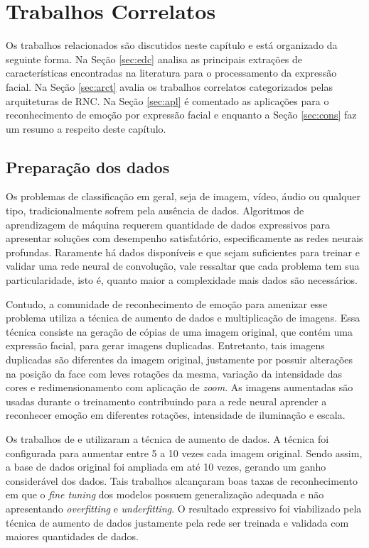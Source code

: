 \chapter{Trabalhos Correlatos}\label{sec:relacionados}
Os trabalhos relacionados são discutidos neste capítulo e está organizado da seguinte forma.  Na Seção \ref{sec:edc} analisa as principais extrações de características encontradas na literatura para o processamento da expressão facial. Na Seção \ref{sec:arct} avalia os trabalhos correlatos categorizados pelas arquiteturas de RNC. Na Seção \ref{sec:apl} é comentado as aplicações para o reconhecimento de emoção por expressão facial e enquanto a Seção \ref{sec:cons} faz um resumo a respeito deste capítulo.


\section{Preparação dos dados}\label{sec:dataprepared}
Os problemas de classificação em geral, seja de imagem, vídeo, áudio ou qualquer tipo, tradicionalmente sofrem pela ausência de dados. Algoritmos de aprendizagem de máquina requerem quantidade de dados expressivos para apresentar soluções com desempenho satisfatório, especificamente as redes neurais profundas. Raramente há dados disponíveis e que sejam suficientes para treinar e validar uma rede neural de convolução, vale ressaltar que cada problema tem sua particularidade, isto é, quanto maior a complexidade mais dados são necessários. 

Contudo, a comunidade de reconhecimento de emoção para amenizar esse problema utiliza a técnica de aumento de dados e multiplicação de imagens. Essa técnica consiste na geração de cópias de uma imagem original, que contém uma expressão facial, para gerar imagens duplicadas. Entretanto, tais imagens duplicadas são diferentes da imagem original, justamente por possuir alterações na posição da face com leves rotações da mesma, variação da intensidade das cores e redimensionamento com aplicação de \textit{zoom}. As imagens aumentadas são usadas durante o treinamento contribuindo para a rede neural aprender a reconhecer emoção em diferentes rotações, intensidade de iluminação e escala. 

Os trabalhos de \cite{art4, art6, art7, art8, art11} e \cite{art15} utilizaram a técnica de aumento de dados. A técnica foi configurada para aumentar entre 5 a 10 vezes cada imagem original. Sendo assim, a base de dados original foi ampliada em até 10 vezes, gerando um ganho considerável dos dados. Tais trabalhos alcançaram boas taxas de reconhecimento em que o \emph{fine tuning} dos modelos possuem generalização adequada e não apresentando \emph{overfitting} e \emph{underfitting}. O resultado expressivo foi viabilizado pela técnica de aumento de dados justamente pela rede ser treinada e validada com maiores quantidades de dados. 

